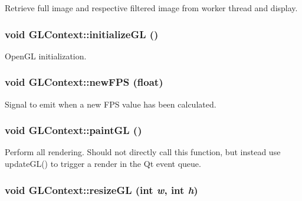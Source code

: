 Retrieve full image and respective filtered image from worker thread and display. \hypertarget{classGLContext_a890225a087cec830eef8a79c2b3ad6c}{
\subsubsection[{initializeGL}]{\setlength{\rightskip}{0pt plus 5cm}void GLContext::initializeGL ()}}
\label{classGLContext_a890225a087cec830eef8a79c2b3ad6c}


OpenGL initialization. \hypertarget{classGLContext_aab9d6eeb0adaeab6a194cfeb7b10f3b}{
\subsubsection[{newFPS}]{\setlength{\rightskip}{0pt plus 5cm}void GLContext::newFPS (float)}}
\label{classGLContext_aab9d6eeb0adaeab6a194cfeb7b10f3b}


Signal to emit when a new FPS value has been calculated. \hypertarget{classGLContext_24e08766dea1888279ffd5499087bc62}{
\subsubsection[{paintGL}]{\setlength{\rightskip}{0pt plus 5cm}void GLContext::paintGL ()}}
\label{classGLContext_24e08766dea1888279ffd5499087bc62}


Perform all rendering. Should not directly call this function, but instead use updateGL() to trigger a render in the Qt event queue. \hypertarget{classGLContext_e4ca1fa439790e7f7ea5338000ce5d8b}{
\subsubsection[{resizeGL}]{\setlength{\rightskip}{0pt plus 5cm}void GLContext::resizeGL (int {\em w}, \/  int {\em h})}}
\label{classGLContext_e4ca1fa439790e7f7ea5338000ce5d8b}


